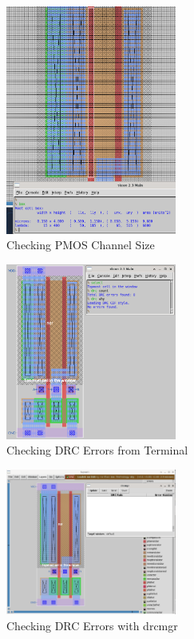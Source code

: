 \documentclass{article}
\begin{document}
	\begin{figure}[H]
		\centerline{\includegraphics[width=0.5\textwidth]{nor_pmos_channel_sizing.png}}
		\caption{Checking PMOS Channel Size}
		\label{fig::nor_pmos_channel_sizing}
	\end{figure}
	
	\begin{figure}[H]
		\centerline{\includegraphics[width=0.5\textwidth]{nor_drc_errors_terminal.png}}
		\caption{Checking DRC Errors from Terminal}
		\label{fig::nor_drc_errors_terminal}
	\end{figure}
	
	\begin{figure}[H]
		\centerline{\includegraphics[width=0.5\textwidth]{nor_drc_errors_drcmgr.png}}
		\caption{Checking DRC Errors with drcmgr}
		\label{fig::nor_drc_errors_drcmgr}
	\end{figure}
	
\end{document}
